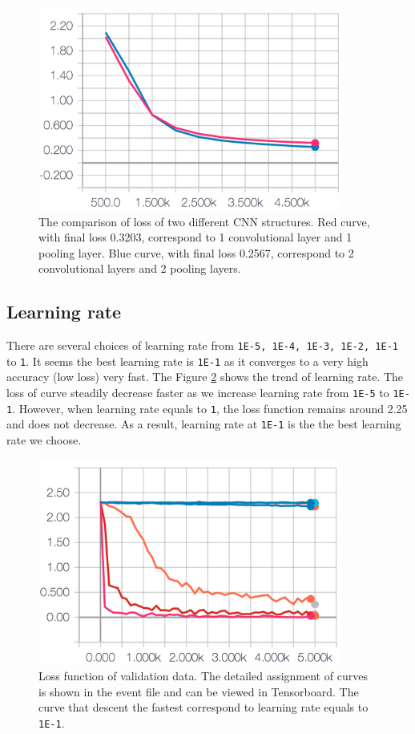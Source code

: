 \documentclass[11pt]{article}
\begin{document}
\begin{figure}[!htb]
   \centering
   \includegraphics[width=10cm]{images/structure.png} %
   \caption{The comparison of loss of two different CNN structures. Red curve, with final loss 0.3203, correspond to 1 convolutional layer and 1 pooling layer. Blue curve, with final loss 0.2567, correspond to 2 convolutional layers and 2 pooling layers.}
   \label{fig:structure}
\end{figure}

\clearpage

\subsection{Learning rate}
There are several choices of learning rate from {\tt 1E-5, 1E-4, 1E-3, 1E-2, 1E-1} to {\tt 1}. It seems the best learning rate is {\tt 1E-1} as it converges to a very high accuracy (low loss) very fast. The Figure \ref{fig:lr} shows the trend of learning rate. The loss of curve steadily decrease faster as we increase learning rate from {\tt 1E-5} to {\tt 1E-1}. However, when learning rate equals to {\tt 1}, the loss function remains around 2.25 and does not decrease. As a result, learning rate at {\tt 1E-1} is the the best learning rate we choose.




\begin{figure}[!htb]
   \centering
   \includegraphics[width=10cm]{images/learning_rate.png} %
   \caption{Loss function of validation data. The detailed assignment of curves is shown in the event file and can be viewed in Tensorboard. The curve that descent the fastest correspond to learning rate equals to {\tt 1E-1}.}
   \label{fig:lr}
\end{figure}
\end{document}
